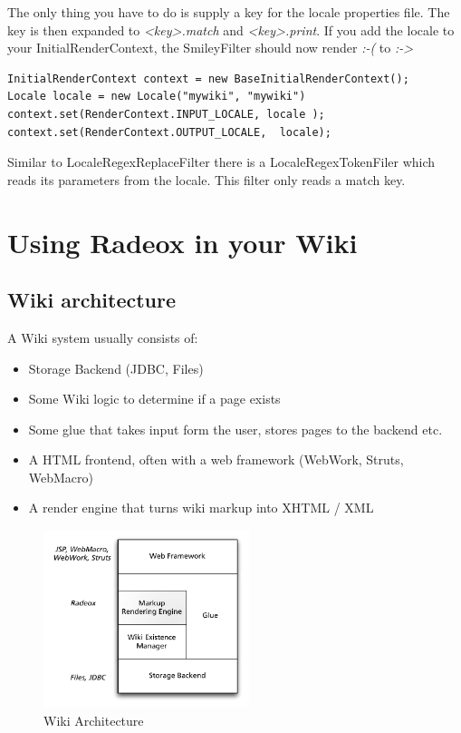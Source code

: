 \documentclass[a4paper,pdftex]{article}
\begin{document}
The only thing you have to do is supply a key for the locale properties file. The key is then expanded to 
{\it <key>.match} and {\it <key>.print}. If you add the locale to your InitialRenderContext, the SmileyFilter should now render \textit{:-(} 
to \textit{:->}

\begin{verbatim}
InitialRenderContext context = new BaseInitialRenderContext();
Locale locale = new Locale("mywiki", "mywiki")
context.set(RenderContext.INPUT_LOCALE, locale );
context.set(RenderContext.OUTPUT_LOCALE,  locale);
\end{verbatim}

Similar to LocaleRegexReplaceFilter there is a LocaleRegexTokenFiler which reads its
parameters from the locale. This filter only reads a match key.

\section{Using Radeox in your Wiki}

\subsection{Wiki architecture}
A Wiki system usually consists of:

\begin{itemize}
\item Storage Backend (JDBC, Files)
\item Some Wiki logic to determine if a page exists
\item Some glue that takes input form the user, stores pages to the backend etc.
\item A HTML frontend, often with a web framework (WebWork, Struts, WebMacro)
\item A render engine that turns wiki markup into XHTML / XML
\end{itemize}

\begin{figure}[ht]
  \centering
    \includegraphics[keepaspectratio,width=6cm]{images/WikiArchitecture}
     \caption{\small\textsf Wiki Architecture}
\end{figure}
\end{document}
